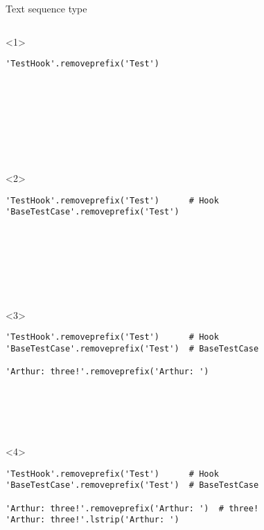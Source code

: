 \begin{frame}[fragile]{Text sequence type}

  \begin{columns}[onlytextwidth]
    \begin{column}{\textwidth}

      \begin{onlyenv}<1>
        \begin{lstlisting}[style=python,basicstyle=\ttfamily\small,keepspaces=true,columns=fullflexible]
'TestHook'.removeprefix('Test')









 \end{lstlisting}
      \end{onlyenv}

      \begin{onlyenv}<2>
        \begin{lstlisting}[style=python,basicstyle=\ttfamily\small,keepspaces=true,columns=fullflexible]
'TestHook'.removeprefix('Test')      # Hook
'BaseTestCase'.removeprefix('Test')








 \end{lstlisting}
      \end{onlyenv}

      \begin{onlyenv}<3>
        \begin{lstlisting}[style=python,basicstyle=\ttfamily\small,keepspaces=true,columns=fullflexible]
'TestHook'.removeprefix('Test')      # Hook
'BaseTestCase'.removeprefix('Test')  # BaseTestCase

'Arthur: three!'.removeprefix('Arthur: ')






 \end{lstlisting}
      \end{onlyenv}

      \begin{onlyenv}<4>
        \begin{lstlisting}[style=python,basicstyle=\ttfamily\small,keepspaces=true,columns=fullflexible]
'TestHook'.removeprefix('Test')      # Hook
'BaseTestCase'.removeprefix('Test')  # BaseTestCase

'Arthur: three!'.removeprefix('Arthur: ')  # three!
'Arthur: three!'.lstrip('Arthur: ')






\end{lstlisting}
\end{onlyenv}
\end{column}
\end{columns}
\end{frame}
